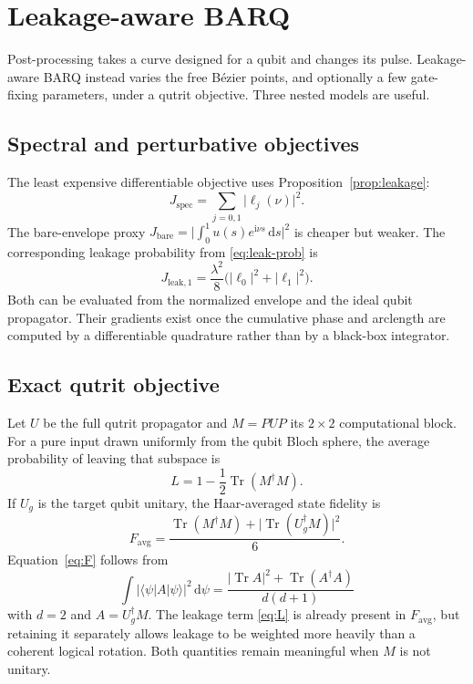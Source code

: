 \documentclass[11pt,a4paper]{article}
\theoremstyle{definition}
\newcommand{\ket}[1]{\lvert #1\rangle}
\newcommand{\bra}[1]{\langle #1\rvert}
\newcommand{\abs}[1]{\lvert #1\rvert}
\newcommand{\Tr}{\operatorname{Tr}}
\newcommand{\dd}{\mathrm{d}}
\newcommand{\ii}{\mathrm{i}}
\begin{document}
\section{Leakage-aware BARQ}
\label{sec:barq}

Post-processing takes a curve designed for a qubit and changes its pulse.
Leakage-aware BARQ instead varies the free B\'ezier points, and optionally a
few gate-fixing parameters, under a qutrit objective.  Three nested models are
useful.

\subsection{Spectral and perturbative objectives}

The least expensive differentiable objective uses
Proposition~\ref{prop:leakage}:
\begin{equation}
  J_{\mathrm{spec}}=\sum_{j=0,1}\abs{\ell_j(\nu)}^2.
\end{equation}
The bare-envelope proxy
\(J_{\mathrm{bare}}=\abs{\int_0^1 u(s)e^{\ii\nu s}\,\dd s}^2\) is cheaper but
weaker.  The corresponding leakage probability from \eqref{eq:leak-prob} is
\begin{equation}
  J_{\mathrm{leak},1}=\frac{\lambda^2}{8}\bigl(\abs{\ell_0}^2+\abs{\ell_1}^2\bigr).
\end{equation}
Both can be evaluated from the normalized envelope and the ideal qubit
propagator.  Their gradients exist once the cumulative phase and arclength are
computed by a differentiable quadrature rather than by a black-box integrator.

\subsection{Exact qutrit objective}
\label{sec:metrics}

Let \(U\) be the full qutrit propagator and \(M=PUP\) its \(2\times2\)
computational block.  For a pure input drawn uniformly from the qubit Bloch
sphere, the average probability of leaving that subspace is
\begin{equation}
\label{eq:L}
  L=1-\frac12\Tr(M^\dagger M).
\end{equation}
If \(U_g\) is the target qubit unitary, the Haar-averaged state fidelity is
\begin{equation}
\label{eq:F}
  F_{\mathrm{avg}}
  =\frac{\Tr(M^\dagger M)+\abs{\Tr(U_g^\dagger M)}^2}{6}.
\end{equation}
Equation~\eqref{eq:F} follows from
\begin{equation}
  \int\abs{\bra{\psi}A\ket{\psi}}^2\,\dd\psi
  =\frac{\abs{\Tr A}^2+\Tr(A^\dagger A)}{d(d+1)}
\end{equation}
with \(d=2\) and \(A=U_g^\dagger M\).  The leakage term \eqref{eq:L} is already
present in \(F_{\mathrm{avg}}\), but retaining it separately allows leakage to
be weighted more heavily than a coherent logical rotation.  Both quantities
remain meaningful when \(M\) is not unitary.
\end{document}
